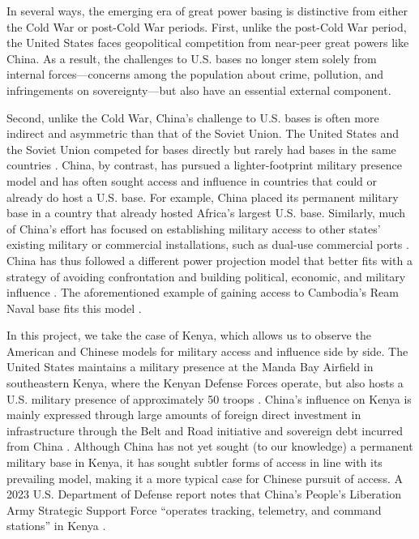 In several ways, the emerging era of great power basing is distinctive from either the Cold War or post-Cold War periods. First, unlike the post-Cold War period, the United States faces geopolitical competition from near-peer great powers like China. As a result, the challenges to U.S. bases no longer stem solely from internal forces—concerns among the population about crime, pollution, and infringements on sovereignty—but also have an essential external component\cite{allen2023}.

Second, unlike the Cold War, China's challenge to U.S. bases is often more indirect and asymmetric than that of the Soviet Union. The United States and the Soviet Union competed for bases directly but rarely had bases in the same countries \cite{Nieman2020}. China, by contrast, has pursued a lighter-footprint military presence model and has often sought access and influence in countries that could or already do host a U.S. base. For example, China placed its permanent military base in a country that already hosted Africa's largest U.S. base. Similarly, much of China's effort has focused on establishing military access to other states' existing military or commercial installations, such as dual-use commercial ports \cite{kardon2022}. China has thus followed a different power projection model that better fits with a strategy of avoiding confrontation and building political, economic, and military influence \cite{Doshi2021}. The aforementioned example of gaining access to Cambodia's Ream Naval base fits this model \cite{gan2023}.


In this project, we take the case of Kenya, which allows us to observe the American and Chinese models for military access and influence side by side. The United States maintains a military presence at the Manda Bay Airfield in southeastern Kenya, where the Kenyan Defense Forces operate, but also hosts a U.S. military presence of approximately 50 troops \cite{allen2022}. China's influence on Kenya is mainly expressed through large amounts of foreign direct investment in infrastructure through the Belt and Road initiative and sovereign debt incurred from China \cite{lesutis2021}. Although China has not yet sought (to our knowledge) a permanent military base in Kenya, it has sought subtler forms of access in line with its prevailing model, making it a more typical case for Chinese pursuit of access. A 2023 U.S. Department of Defense report notes that China's People's Liberation Army Strategic Support Force ``operates tracking, telemetry, and command stations'' in Kenya \cite{DOD2023}. 

